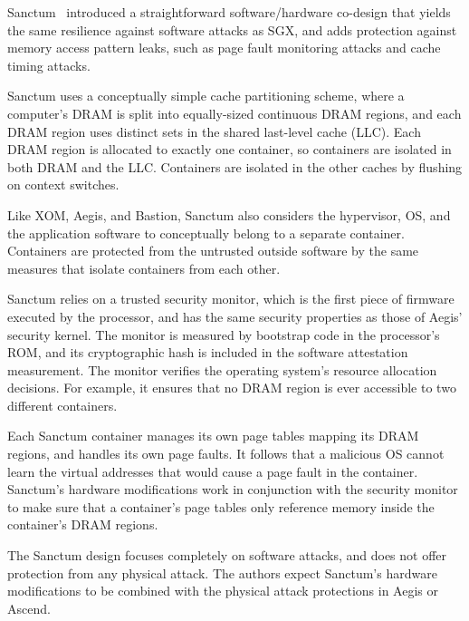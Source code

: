 Sanctum~\cite{costan2015sanctum} introduced a straightforward software/hardware
co-design that yields the same resilience against software attacks as SGX, and
adds protection against memory access pattern leaks, such as page fault
monitoring attacks and cache timing attacks.

Sanctum uses a conceptually simple cache partitioning scheme, where a
computer's DRAM is split into equally-sized continuous DRAM regions, and each
DRAM region uses distinct sets in the shared last-level cache (LLC). Each DRAM
region is allocated to exactly one container, so containers are isolated in
both DRAM and the LLC. Containers are isolated in the other caches by flushing
on context switches.

Like XOM, Aegis, and Bastion, Sanctum also considers the hypervisor, OS, and the
application software to conceptually belong to a separate container. Containers
are protected from the untrusted outside software by the same measures that
isolate containers from each other.

Sanctum relies on a trusted security monitor, which is the first piece of
firmware executed by the processor, and has the same security properties as
those of Aegis' security kernel. The monitor is measured by bootstrap code in
the processor's ROM, and its cryptographic hash is included in the software
attestation measurement. The monitor verifies the operating system's resource
allocation decisions. For example, it ensures that no DRAM region is ever
accessible to two different containers.

Each Sanctum container manages its own page tables mapping its DRAM regions,
and handles its own page faults. It follows that a malicious OS cannot learn the
virtual addresses that would cause a page fault in the container. Sanctum's
hardware modifications work in conjunction with the security monitor to make
sure that a container's page tables only reference memory inside the container's
DRAM regions.

The Sanctum design focuses completely on software attacks, and does not offer
protection from any physical attack. The authors expect Sanctum's hardware
modifications to be combined with the physical attack protections in Aegis or
Ascend.
